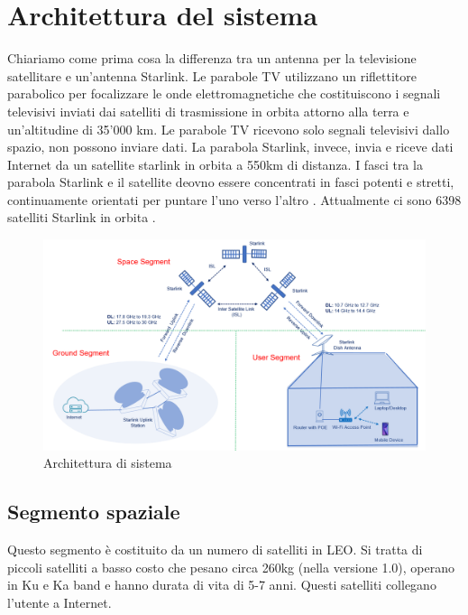 
\chapter{Architettura del sistema}

Chiariamo come prima cosa la differenza tra un antenna per la televisione satellitare e un'antenna Starlink.
Le parabole TV utilizzano un riflettitore parabolico per focalizzare le onde elettromagnetiche che costituiscono i segnali televisivi inviati dai satelliti di trasmissione in orbita attorno alla terra e un'altitudine di 35'000 km.
Le parabole TV ricevono solo segnali televisivi dallo spazio, non possono inviare dati.
La parabola Starlink, invece, invia e riceve dati Internet da un satellite starlink in orbita a 550km di distanza.
I fasci tra la parabola Starlink e il satellite deovno essere concentrati in fasci potenti e stretti, continuamente orientati per puntare l'uno verso l'altro \cite{branch_education_how_2022}.
Attualmente ci sono 6398 satelliti Starlink in orbita \cite{jonathan_mcdowell_starlink_nodate}.

\begin{figure}[htbp]
  \centering
  \includegraphics[width=0.9\linewidth]{./res/img/starlink-system-architecture.png}
  \caption{Architettura di sistema \cite{techplayon_spacex_2024}}
  \label{fig:starlink-system-architecture}
\end{figure}

\section{Segmento spaziale}
Questo segmento è costituito da un numero di satelliti in \ac{LEO}. Si tratta di piccoli satelliti a basso costo che pesano circa 260kg (nella versione 1.0), operano in \ac{Ku} e \ac{Ka} band e hanno durata di vita di 5-7 anni. \cite{techplayon_spacex_2024} Questi satelliti collegano l'utente a Internet.

